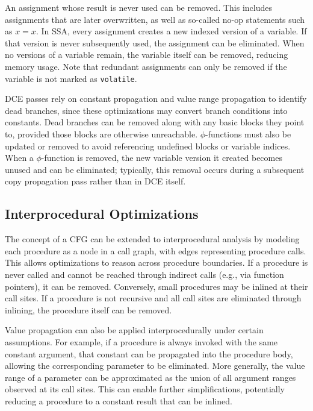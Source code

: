 An assignment whose result is never used can be removed. This includes assignments that are later overwritten, as well as so-called no-op statements such as $x = x$. In \acf{SSA}, every assignment creates a new indexed version of a variable. If that version is never subsequently used, the assignment can be eliminated. When no versions of a variable remain, the variable itself can be removed, reducing memory usage. Note that redundant assignments can only be removed if the variable is not marked as \texttt{volatile}.  

\ac{DCE} passes rely on constant propagation and value range propagation to identify dead branches, since these optimizations may convert branch conditions into constants. Dead branches can be removed along with any basic blocks they point to, provided those blocks are otherwise unreachable. $\phi$-functions must also be updated or removed to avoid referencing undefined blocks or variable indices. When a $\phi$-function is removed, the new variable version it created becomes unused and can be eliminated; typically, this removal occurs during a subsequent copy propagation pass rather than in DCE itself\cite{dragon-book}.

\subsection{Interprocedural Optimizations}

The concept of a \ac{CFG} can be extended to interprocedural analysis by modeling each procedure as a node in a call graph, with edges representing procedure calls. This allows optimizations to reason across procedure boundaries. If a procedure is never called and cannot be reached through indirect calls (e.g., via function pointers), it can be removed. Conversely, small procedures may be inlined at their call sites. If a procedure is not recursive and all call sites are eliminated through inlining, the procedure itself can be removed.

Value propagation can also be applied interprocedurally under certain assumptions. For example, if a procedure is always invoked with the same constant argument, that constant can be propagated into the procedure body, allowing the corresponding parameter to be eliminated. More generally, the value range of a parameter can be approximated as the union of all argument ranges observed at its call sites. This can enable further simplifications, potentially reducing a procedure to a constant result that can be inlined.

